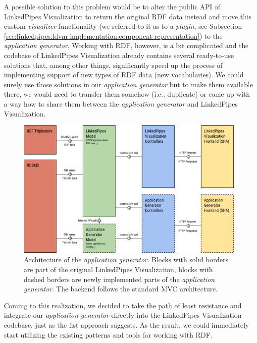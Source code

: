 A possible solution to this problem would be to alter the public API of LinkedPipes Visualization to return the original RDF data instead and move this custom \emph{visualizer} functionality (we referred to it as to a \emph{plugin}, see Subsection \ref{sec:linkedpipes:ldvm-implementation:component-representation}) to the \emph{application generator}. Working with RDF, however, is a bit complicated and the codebase of LinkedPipes Visualization already contains several ready-to-use solutions that, among other things, significantly speed up the process of implementing support of new types of RDF data (new vocabularies). We could surely use those solutions in our \emph{application generator} but to make them available there, we would need to transfer them somehow (i.e., duplicate) or come up with a way how to share them between the \emph{application generator} and LinkedPipes Visualization.

\begin{figure}
	\centering
	\includegraphics[width=140mm]{img/04_application_generator_architecture.png}
	\caption{Architecture of the \emph{application generator}. Blocks with solid borders are part of the original LinkedPipes Visualization, blocks with dashed borders are newly implemented parts of the \emph{application generator}. The backend follows the standard MVC architecture.} 
	\label{fig:proposed-application-generator-architecture}
\end{figure}

Coming to this realization, we decided to take the path of least resistance and integrate our \emph{application generator} directly into the LinkedPipes Visualization codebase, just as the fist approach suggests. As the result, we could immediately start utilizing the existing patterns and tools for working with RDF. 

